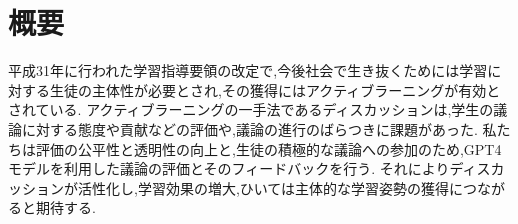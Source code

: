 \chapter{概要}
平成31年に行われた学習指導要領の改定で,今後社会で生き抜くためには学習に対する生徒の主体性が必要とされ,その獲得にはアクティブラーニングが有効とされている.
アクティブラーニングの一手法であるディスカッションは,学生の議論に対する態度や貢献などの評価や,議論の進行のばらつきに課題があった.
私たちは評価の公平性と透明性の向上と,生徒の積極的な議論への参加のため,GPT4モデルを利用した議論の評価とそのフィードバックを行う.
それによりディスカッションが活性化し,学習効果の増大,ひいては主体的な学習姿勢の獲得につながると期待する.
